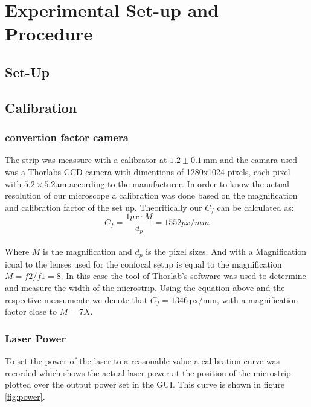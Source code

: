 \section{Experimental Set-up and Procedure}
\subsection{Set-Up}

\subsection{Calibration}
\subsubsection{convertion factor camera}
The strip was meassure with a calibrator at $1.2\pm 0.1\,\mathrm{mm}$ and the camara used was a Thorlabs CCD camera with dimentions of 1280x1024 pixels, each pixel with $5.2\times5.2 \mathrm{\mu m}$ according to the manufacturer.
In order to know the actual resolution of our microscope a calibration was done based on the magnification and calibration factor of the set up.
Theoritically our $C_{f}$ can be calculated as:
\\

\begin{equation}
C_{f}=\dfrac{1 px \cdot M}{d_{p}} = 1552 px/mm
\end{equation}\\
Where $M$ is the magnification and $d_{p}$ is the pixel sizes. And with a Magnification icual to the lenses used for the confocal setup is equal to the magnification $M=f2/f1=8$.
In this case the tool of Thorlab’s software was used to determine and measure the width of the microstrip. Using the equation above and the respective measumente we denote that  $C_{f} =1346 \,\mathrm{px/mm}$, with a magnification factor close to $M=7X$.

\subsubsection{Laser Power}
To set the power of the laser to a reasonable value a calibration curve was recorded which shows the actual laser power at the position of the microstrip plotted over the output power set in the GUI. This curve is shown in figure \ref{fig:power}.\\

